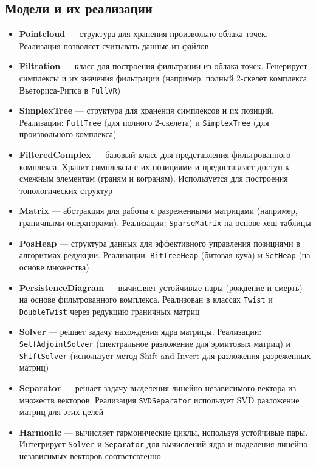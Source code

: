 \documentclass{article}
\begin{document}
\subsection{Модели и их реализации}
\begin{itemize}
\item \textbf{Pointcloud} — структура для хранения произвольно облака точек. Реализация позволяет считывать данные из файлов

\item \textbf{Filtration} — класс для построения фильтрации из облака точек. Генерирует симплексы и их значения фильтрации (например, полный 2-скелет комплекса Вьеториса-Рипса в \texttt{FullVR})

\item \textbf{SimplexTree} — структура для хранения симплексов и их позиций. Реализации: \texttt{FullTree} (для полного 2-скелета) и \texttt{SimplexTree} (для произвольного комплекса)

\item \textbf{FilteredComplex} — базовый класс для представления фильтрованного комплекса. Хранит симплексы с их позициями и предоставляет доступ к смежным элементам (граням и кограням). Используется для построения топологических структур

\item \textbf{Matrix} — абстракция для работы с разреженными матрицами (например, граничными операторами). Реализации: \texttt{SparseMatrix} на основе хеш-таблицы

\item \textbf{PosHeap} — структура данных для эффективного управления позициями в алгоритмах редукции. Реализации: \texttt{BitTreeHeap} (битовая куча) и \texttt{SetHeap} (на основе множества)

\item \textbf{PersistenceDiagram} — вычисляет устойчивые пары (рождение и смерть) на основе фильтрованного комплекса. Реализован в классах \texttt{Twist} и \texttt{DoubleTwist} через редукцию граничных матриц

\item \textbf{Solver} — решает задачу нахождения ядра матрицы. Реализации: \texttt{SelfAdjointSolver} (спектральное разложение для эрмитовых матриц) и \texttt{ShiftSolver} (использует метод Shift and Invert для разложения разреженных матриц)

\item \textbf{Separator} — решает задачу выделения линейно-независимого вектора из множеств векторов. Реализация \texttt{SVDSeparator} использует SVD разложение матриц для этих целей

\item \textbf{Harmonic} — вычисляет гармонические циклы, используя устойчивые пары. Интегрирует \texttt{Solver} и \texttt{Separator} для вычислений ядра и выделения линейно-независимых векторов соответсвтенно
\end{itemize}
\end{document}
